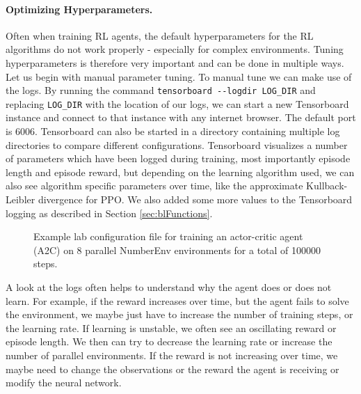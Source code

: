 \paragraph{Optimizing Hyperparameters.}
Often when training RL agents, the default hyperparameters for the RL algorithms do not work properly - especially for complex environments. Tuning hyperparameters is therefore very important and can be done in multiple ways. Let us begin with manual parameter tuning. To manual tune we can make use of the logs. By running the command \texttt{tensorboard -{}-logdir LOG\_DIR} and replacing \texttt{LOG\_DIR} with the location of our logs, we can start a new Tensorboard instance and connect to that instance with any internet browser. The default port is 6006. Tensorboard can also be started in a directory containing multiple log directories to compare different configurations. Tensorboard visualizes a number of parameters which have been logged during training, most importantly episode length and episode reward, but depending on the learning algorithm used, we can also see algorithm specific parameters over time, like the approximate Kullback-Leibler divergence for PPO. We also added some more values to the Tensorboard logging as described in Section \ref{sec:blFunctions}.  

\begin{figure}[ht!]
    
    \caption[Lab Configuration File for the Number Environment]{Example lab configuration file for training an actor-critic agent (A2C) on 8 parallel NumberEnv environments for a total of 100000 steps.}
    \label{fig:NumberEnvConfigSearch}
\end{figure}

A look at the logs often helps to understand why the agent does or does not learn. For example, if the reward increases over time, but the agent fails to solve the environment, we maybe just have to increase the number of training steps, or the learning rate. If learning is unstable, we often see an oscillating reward or episode length. We then can try to decrease the learning rate or increase the number of parallel environments. If the reward is not increasing over time, we maybe need to change the observations or the reward the agent is receiving or modify the neural network. 


